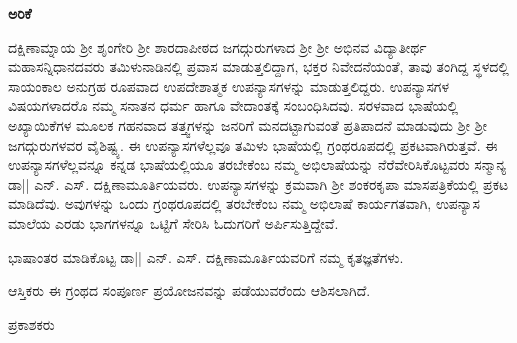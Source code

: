 \begin{center}
{\huge\bfseries{ಅರಿಕೆ}}
\end{center}

\medskip

ದಕ್ಷಿಣಾಮ್ನಾಯ ಶ್ರೀ ಶೃಂಗೇರಿ ಶ್ರೀ ಶಾರದಾಪೀಠದ ಜಗದ್ಗುರುಗಳಾದ ಶ್ರೀ ಶ್ರೀ ಅಭಿನವ ವಿದ್ಯಾತೀರ್ಥ ಮಹಾಸನ್ನಿಧಾನದವರು 
ತಮಿಳುನಾಡಿನಲ್ಲಿ ಪ್ರವಾಸ ಮಾಡುತ್ತಲಿದ್ದಾಗ, ಭಕ್ತರ ನಿವೇದನೆಯಂತೆ, ತಾವು ತಂಗಿದ್ದ ಸ್ಥಳದಲ್ಲಿ ಸಾಯಂಕಾಲ ಅನುಗ್ರಹ 
ರೂಪವಾದ ಉಪದೇಶಾತ್ಮಕ ಉಪನ್ಯಾಸಗಳನ್ನು ಮಾಡುತ್ತಲಿದ್ದರು. ಉಪನ್ಯಾಸಗಳ ವಿಷಯಗಳಾದರೊ ನಮ್ಮ ಸನಾತನ 
ಧರ್ಮ ಹಾಗೂ ವೇದಾಂತಕ್ಕೆ ಸಂಬಂಧಿಸಿದವು. ಸರಳವಾದ ಭಾಷೆಯಲ್ಲಿ ಅಖ್ಯಾಯಿಕೆಗಳ ಮೂಲಕ ಗಹನವಾದ ತತ್ತ್ವಗಳನ್ನು 
ಜನರಿಗೆ ಮನದಟ್ಟಾಗುವಂತೆ ಪ್ರತಿಪಾದನೆ ಮಾಡುವುದು ಶ್ರೀ ಶ್ರೀ ಜಗದ್ಗುರುಗಳವರ ವೈಶಿಷ್ಟ್ಯ. ಈ ಉಪನ್ಯಾಸಗಳೆಲ್ಲವೂ ತಮಿಳು 
ಭಾಷೆಯಲ್ಲಿ ಗ್ರಂಥರೂಪದಲ್ಲಿ ಪ್ರಕಟವಾಗಿರುತ್ತವೆ. ಈ ಉಪನ್ಯಾಸಗಳೆಲ್ಲವನ್ನೂ ಕನ್ನಡ ಭಾಷೆಯಲ್ಲಿಯೂ ತರಬೇಕೆಂಬ ನಮ್ಮ 
ಅಭಿಲಾಷೆಯನ್ನು ನೆರೆವೇರಿಸಿಕೊಟ್ಟವರು ಸನ್ಮಾನ್ಯ ಡಾ|| ಎನ್. ಎಸ್. ದಕ್ಷಿಣಾಮೂರ್ತಿಯವರು. ಉಪನ್ಯಾಸಗಳನ್ನು ಕ್ರಮವಾಗಿ 
ಶ್ರೀ ಶಂಕರಕೃಪಾ ಮಾಸಪತ್ರಿಕೆಯಲ್ಲಿ ಪ್ರಕಟ ಮಾಡಿದೆವು. ಅವುಗಳನ್ನು ಒಂದು ಗ್ರಂಥರೂಪದಲ್ಲಿ ತರಬೇಕೆಂಬ ನಮ್ಮ ಅಭಿಲಾಷೆ ಕಾರ್ಯಗತವಾಗಿ, 
ಉಪನ್ಯಾಸ ಮಾಲೆಯ ಎರಡು ಭಾಗಗಳನ್ನೂ ಒಟ್ಟಿಗೆ ಸೇರಿಸಿ ಓದುಗರಿಗೆ ಅರ್ಪಿಸುತ್ತಿದ್ದೇವೆ. 

ಭಾಷಾಂತರ ಮಾಡಿಕೊಟ್ಟ ಡಾ|| ಎನ್. ಎಸ್. ದಕ್ಷಿಣಾಮೂರ್ತಿಯವರಿಗೆ ನಮ್ಮ ಕೃತಜ್ಞತೆಗಳು.

ಆಸ್ತಿಕರು ಈ ಗ್ರಂಥದ ಸಂಪೂರ್ಣ ಪ್ರಯೋಜನವನ್ನು ಪಡೆಯುವರೆಂದು ಆಶಿಸಲಾಗಿದೆ.


\vskip 1cm

\hfill{ಪ್ರಕಾಶಕರು}

